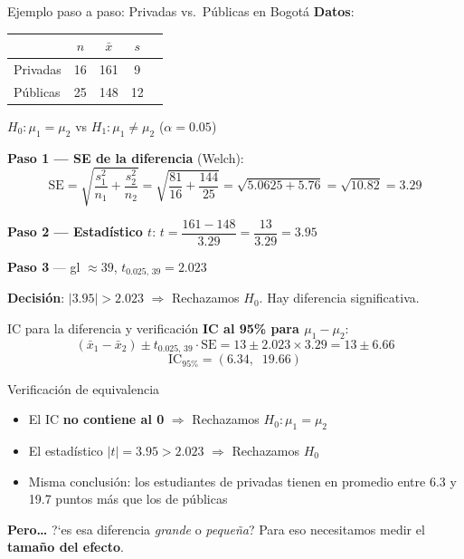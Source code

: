 \documentclass[aspectratio=169, 11pt]{beamer}
\begin{document}
\begin{frame}{Ejemplo paso a paso: Privadas vs.\ P\'ublicas en Bogot\'a}
\small
\textbf{Datos}:

\begin{center}
\begin{tabular}{lcccc}
\toprule
& $n$ & $\bar{x}$ & $s$ \\
\midrule
Privadas & 16 & 161 & 9 \\
P\'ublicas & 25 & 148 & 12 \\
\bottomrule
\end{tabular}
\end{center}

$H_0: \mu_1 = \mu_2$ \quad vs \quad $H_1: \mu_1 \neq \mu_2$ \quad ($\alpha = 0.05$)

\vspace{0.2cm}
\textbf{Paso 1 --- SE de la diferencia} (Welch):
\[
\text{SE} = \sqrt{\frac{s_1^2}{n_1} + \frac{s_2^2}{n_2}} = \sqrt{\frac{81}{16} + \frac{144}{25}} = \sqrt{5.0625 + 5.76} = \sqrt{10.82} = 3.29
\]

\textbf{Paso 2 --- Estad\'istico $t$}:
$t = \dfrac{161 - 148}{3.29} = \dfrac{13}{3.29} = 3.95$

\textbf{Paso 3} --- gl $\approx 39$, $t_{0.025,\,39} = 2.023$

\textbf{Decisi\'on}: $|3.95| > 2.023$ $\Rightarrow$ \alert{Rechazamos $H_0$}. Hay diferencia significativa.
\end{frame}

\begin{frame}{IC para la diferencia y verificaci\'on}
\small
\textbf{IC al 95\% para $\mu_1 - \mu_2$}:
\[
(\bar{x}_1 - \bar{x}_2) \pm t_{0.025,\,39} \cdot \text{SE} = 13 \pm 2.023 \times 3.29 = 13 \pm 6.66
\]
\[
\boxed{\text{IC}_{95\%} = (6.34,\;\; 19.66)}
\]

\vspace{0.2cm}
\begin{block}{Verificaci\'on de equivalencia}
\begin{itemize}
  \item El IC \textbf{no contiene al 0} $\Rightarrow$ Rechazamos $H_0: \mu_1 = \mu_2$
  \item El estad\'istico $|t| = 3.95 > 2.023$ $\Rightarrow$ Rechazamos $H_0$
  \item \alert{Misma conclusi\'on}: los estudiantes de privadas tienen en promedio entre 6.3 y 19.7 puntos m\'as que los de p\'ublicas
\end{itemize}
\end{block}

\vspace{0.2cm}
\textbf{Pero\ldots} ?`es esa diferencia \emph{grande} o \emph{peque\~na}? Para eso necesitamos medir el \textbf{tama\~no del efecto}.
\end{frame}
\end{document}
